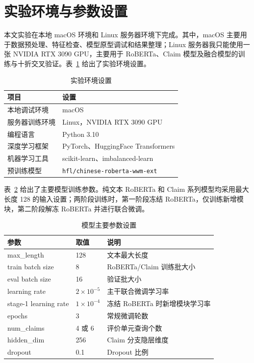 \documentclass[UTF8,oneside,openright,fontset=none]{ctexbook}
\numberwithin{equation}{chapter}
\begin{document}
\section{实验环境与参数设置}
本文实验在本地 macOS 环境和 Linux 服务器环境下完成。其中，macOS 主要用于数据预处理、特征检查、模型原型调试和结果整理；Linux 服务器我只能使用一张 NVIDIA RTX 3090 GPU，主要用于 RoBERTa、Claim 模型及融合模型的训练与十折交叉验证。表~\ref{tab:env} 给出了实验环境设置。

\begin{table}[htbp]
  \centering
  \caption{实验环境设置}
  \label{tab:env}
  \begin{tabular}{ll}
    \toprule
    项目 & 设置 \\
    \midrule
    本地调试环境 & macOS \\
    服务器训练环境 & Linux，NVIDIA RTX 3090 GPU \\
    编程语言 & Python 3.10 \\
    深度学习框架 & PyTorch、HuggingFace Transformers \\
    机器学习工具 & scikit-learn、imbalanced-learn \\
    预训练模型 & \texttt{hfl/chinese-roberta-wwm-ext} \\
    \bottomrule
  \end{tabular}
\end{table}

表~\ref{tab:hyper} 给出了主要模型训练参数。纯文本 RoBERTa 和 Claim 系列模型均采用最大长度 128 的输入设置；两阶段训练时，第一阶段冻结 RoBERTa，仅训练新增模块，第二阶段解冻 RoBERTa 并进行联合微调。

\begin{table}[htbp]
  \centering
  \caption{模型主要参数设置}
  \label{tab:hyper}
  \begin{tabular}{lll}
    \toprule
    参数 & 取值 & 说明 \\
    \midrule
    max\_length & 128 & 文本最大长度 \\
    train batch size & 8 & RoBERTa/Claim 训练批大小 \\
    eval batch size & 16 & 验证批大小 \\
    learning rate & $2\times10^{-5}$ & 主干联合微调学习率 \\
    stage-1 learning rate & $1\times10^{-4}$ & 冻结 RoBERTa 时新增模块学习率 \\
    epochs & 3 & 常规微调轮数 \\
    num\_claims & 4 或 6 & 评价单元查询个数 \\
    hidden\_dim & 256 & Claim 分支隐层维度 \\
    dropout & 0.1 & Dropout 比例 \\
    \bottomrule
  \end{tabular}
\end{table}
\end{document}
